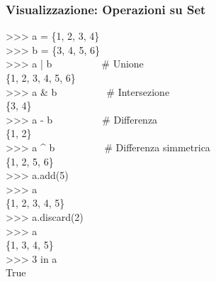 \subsubsection{Visualizzazione: Operazioni su Set}
\begin{tcolorbox}[title=Output Terminale, colback=black, coltext=green!80!white, fontupper=\ttfamily\small]
>>> a = \{1, 2, 3, 4\}\\
>>> b = \{3, 4, 5, 6\}\\
>>> a | b\ \ \ \ \ \ \ \ \ \ \# Unione\\
\{1, 2, 3, 4, 5, 6\}\\
>>> a \& b\ \ \ \ \ \ \ \ \ \ \# Intersezione\\
\{3, 4\}\\
>>> a - b\ \ \ \ \ \ \ \ \ \ \# Differenza\\
\{1, 2\}\\
>>> a \^{} b\ \ \ \ \ \ \ \ \ \ \# Differenza simmetrica\\
\{1, 2, 5, 6\}\\
>>> a.add(5)\\
>>> a\\
\{1, 2, 3, 4, 5\}\\
>>> a.discard(2)\\
>>> a\\
\{1, 3, 4, 5\}\\
>>> 3 in a\\
True
\end{tcolorbox}
